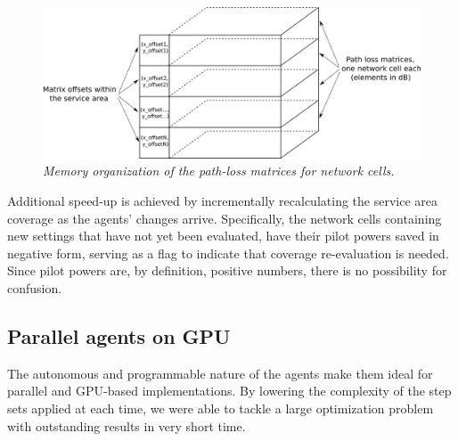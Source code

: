 \begin{figure}
\centering

\includegraphics[width=1\textwidth]{07-experimental_evaluation/img/pathloss_matrices}

\caption{\textit{Memory organization of the path-loss matrices for network
cells.\label{fig:path-loss_matrices_memory_organization}}}
\end{figure}


Additional speed-up is achieved by incrementally recalculating the
service area coverage as the agents' changes arrive. Specifically,
the network cells containing new settings that have not yet been evaluated,
have their pilot powers saved in negative form, serving as a flag
to indicate that coverage re-evaluation is needed. Since pilot powers
are, by definition, positive numbers, there is no possibility for
confusion.


\subsection{Parallel agents on GPU}

The autonomous and programmable nature of the agents make them ideal
for parallel and GPU-based implementations. By lowering the complexity
of the step sets applied at each time, we were able to tackle a large
optimization problem with outstanding results in very short time.

